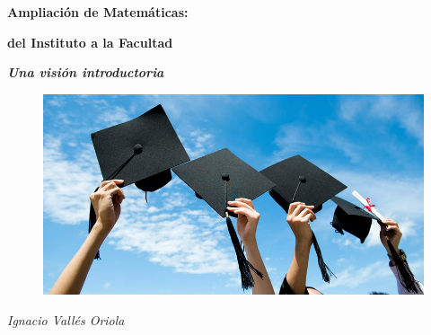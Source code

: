 \begin{center}

\Huge{\textbf{Ampliación de Matemáticas:}}

\huge{\textbf{del Instituto a la Facultad}} 


\Large{\textbf{\textit{Una visión introductoria}}}

\vspace{10mm}
\begin{figure}[H]
	\centering
	\includegraphics[width=.78\textwidth]{imagenes/presenta2.png}
\end{figure}

\vspace{2cm}
\begin{flushright}
	\normalsize{\emph{Ignacio Vallés Oriola}}
\end{flushright}


\end{center}






